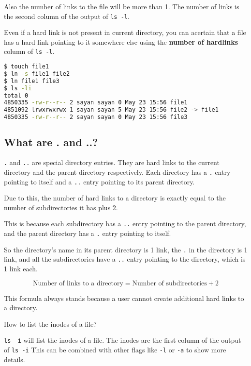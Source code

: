 Also the number of links to the file will be more than 1.
The number of links is the second
column of the output of \texttt{ls -l}.

Even if a hard link is not present in current directory, you can acertain that a file has a hard link pointing to it somewhere else using the \textbf{number of hardlinks} column of \texttt{ls -l}.

\begin{lstlisting}[language=bash]
$ touch file1
$ ln -s file1 file2
$ ln file1 file3
$ ls -li
total 0
4850335 -rw-r--r-- 2 sayan sayan 0 May 23 15:56 file1
4851092 lrwxrwxrwx 1 sayan sayan 5 May 23 15:56 file2 -> file1
4850335 -rw-r--r-- 2 sayan sayan 0 May 23 15:56 file3
\end{lstlisting}

\subsection{What are . and ..?}

\texttt{.} and \texttt{..} are special directory entries.
They are hard links to the current directory and the parent directory respectively.
Each directory has a \texttt{.} entry pointing to itself and a \texttt{..} entry pointing to its parent directory.

Due to this, the number of hard links to a directory is exactly equal to the number of subdirectories it has plus 2.

This is because each subdirectory has a \texttt{..} entry pointing to the parent directory, and the parent directory has a \texttt{.} entry pointing to itself.

So the directory's name in its parent directory is 1 link,
the \texttt{.} in the directory is 1 link,
and all the subdirectories have a \texttt{..} entry pointing to the directory, which is 1 link each.

\[
  \text{Number of links to a directory} = \text{Number of subdirectories} + 2
\]

This formula always stands because a user cannot create additional hard links to a directory.





\begin{qs}
  How to list the inodes of a file?
\end{qs}

\begin{ans}
  \texttt{ls -i} will list the inodes of a file.
  The inodes are the first column of the output of \texttt{ls -i}
  This can be combined with other flags like \texttt{-l} or \texttt{-a} to show more details.
\end{ans}

